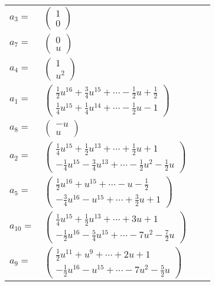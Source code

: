\documentclass[1p]{elsarticle_modified}
\theoremstyle{definition}
\begin{document}
\begin{tabular}{m{7pt} m{180pt} m{7pt} m{180pt} }
\flushright $a_{3}=$&$\begin{pmatrix}1\\0\end{pmatrix}$ \\
\flushright $a_{7}=$&$\begin{pmatrix}0\\u\end{pmatrix}$ \\
\flushright $a_{4}=$&$\begin{pmatrix}1\\u^2\end{pmatrix}$ \\
\flushright $a_{1}=$&$\begin{pmatrix}\frac{1}{2} u^{16}+\frac{3}{4} u^{15}+\cdots-\frac{1}{2} u+\frac{1}{2}\\\frac{1}{4} u^{15}+\frac{1}{4} u^{14}+\cdots-\frac{1}{2} u-1\end{pmatrix}$ \\
\flushright $a_{8}=$&$\begin{pmatrix}- u\\u\end{pmatrix}$ \\
\flushright $a_{2}=$&$\begin{pmatrix}\frac{1}{4} u^{15}+\frac{1}{2} u^{13}+\cdots+\frac{1}{2} u+1\\-\frac{1}{4} u^{15}-\frac{3}{4} u^{13}+\cdots-\frac{1}{2} u^2-\frac{1}{2} u\end{pmatrix}$ \\
\flushright $a_{5}=$&$\begin{pmatrix}\frac{1}{2} u^{16}+u^{15}+\cdots- u-\frac{1}{2}\\-\frac{3}{4} u^{16}- u^{15}+\cdots+\frac{3}{2} u+1\end{pmatrix}$ \\
\flushright $a_{10}=$&$\begin{pmatrix}\frac{1}{4} u^{15}+\frac{1}{2} u^{13}+\cdots+3 u+1\\-\frac{1}{2} u^{16}-\frac{5}{4} u^{15}+\cdots-7 u^2-\frac{7}{2} u\end{pmatrix}$ \\
\flushright $a_{9}=$&$\begin{pmatrix}\frac{1}{2} u^{11}+u^9+\cdots+2 u+1\\-\frac{1}{2} u^{16}- u^{15}+\cdots-7 u^2-\frac{5}{2} u\end{pmatrix}$ \\

\end{tabular}
\end{document}
